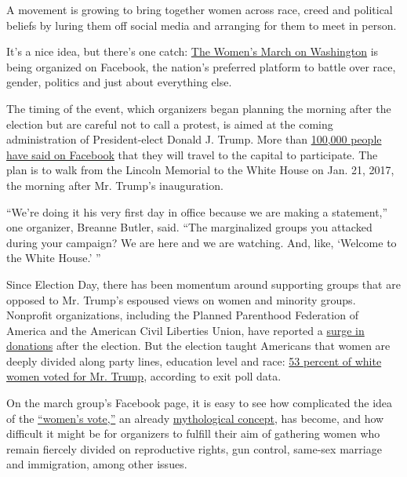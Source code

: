 A movement is growing to bring together women across race, creed and
political beliefs by luring them off social media and arranging for them
to meet in person.

It's a nice idea, but there's one catch:
\href{https://www.facebook.com/events/2169332969958991/}{The Women's
March on Washington} is being organized on Facebook, the nation's
preferred platform to battle over race, gender, politics and just about
everything else.

The timing of the event, which organizers began planning the morning
after the election but are careful not to call a protest, is aimed at
the coming administration of President-elect Donald J. Trump. More than
\href{https://www.facebook.com/events/2169332969958991/?active_tab=discussion}{100,000
people have said on Facebook} that they will travel to the capital to
participate. The plan is to walk from the Lincoln Memorial to the White
House on Jan. 21, 2017, the morning after Mr. Trump's inauguration.

``We're doing it his very first day in office because we are making a
statement,'' one organizer, Breanne Butler, said. ``The marginalized
groups you attacked during your campaign? We are here and we are
watching. And, like, `Welcome to the White House.' ''

Since Election Day, there has been momentum around supporting groups
that are opposed to Mr. Trump's espoused views on women and minority
groups. Nonprofit organizations, including the Planned Parenthood
Federation of America and the American Civil Liberties Union, have
reported a
\href{http://www.nytimes.com/2016/11/18/us/politics/nonprofit-donations-trump.html}{surge
in donations} after the election. But the election taught Americans that
women are deeply divided along party lines, education level and race:
\href{http://www.nytimes.com/2016/12/01/us/politics/white-women-helped-elect-donald-trump.html}{53
percent of white women voted for Mr. Trump}, according to exit poll
data.

On the march group's Facebook page, it is easy to see how complicated
the idea of the
\href{http://www.nytimes.com/2016/11/13/opinion/the-myth-of-female-solidarity.html}{``women's
vote,''} an already
\href{http://www.nytimes.com/2016/11/15/magazine/the-dream-and-the-myth-of-the-womens-vote.html}{mythological
concept}, has become, and how difficult it might be for organizers to
fulfill their aim of gathering women who remain fiercely divided on
reproductive rights, gun control, same-sex marriage and immigration,
among other issues.

